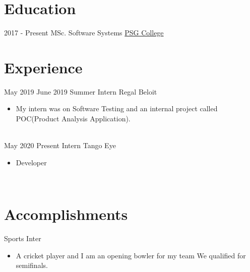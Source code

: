 \documentclass[letterpaper]{Baseclass}
\begin{document}
\makeprofile 

\section{Education}

\begin{envvar}
	\envvaritem
    	{2017 - Present}
        {}
        {\hspace{0.2cm}MSc. Software Systems }
        {\href{http://www.psgtech.edu/}{\hspace{0.27cm}PSG College}}
        {}
        {} 
\end{envvar}


\section{Experience}

\begin{envvar}
	\envvaritem
		{May 2019}
		{June 2019}
		{\hspace{0.3cm}Summer Intern}
		{{Regal Beloit}}
		{}
		{\begin{itemize}
			\item My intern was on Software Testing and an internal project called POC(Product Analysis Application).
		\end{itemize}}
		\\
	\envvaritem
    	{May 2020}
		{Present}
        {\hspace{0.3cm}Intern}
        {{Tango Eye}}
        {}
        {\begin{itemize}
        \item Developer
        \end{itemize}}
        \\           
\end{envvar}

\section{Accomplishments}

\begin{envvar} 
	\envvaritem
	{Sports}
	{}
	{\hspace{0.3cm}Inter}
	{}
	{}
	{
		{\begin{itemize}
				\item A cricket player and I am an opening bowler for my team We qualified for semifinals.
		\end{itemize}}
	}
	\\

\end{envvar}
\end{document}
